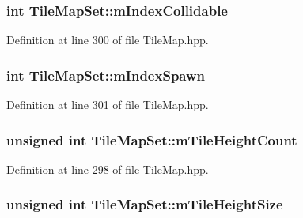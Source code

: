\hypertarget{class_tile_map_set_a02448f7bf82af58a2b660b7c4811479d}{
\subsubsection[{m\-Index\-Collidable}]{\setlength{\rightskip}{0pt plus 5cm}int Tile\-Map\-Set\-::m\-Index\-Collidable\hspace{0.3cm}{\ttfamily [protected]}}}\label{class_tile_map_set_a02448f7bf82af58a2b660b7c4811479d}


Definition at line 300 of file Tile\-Map.\-hpp.

\hypertarget{class_tile_map_set_abdcf3d4f5e9d82aeba620a7358068a42}{
\subsubsection[{m\-Index\-Spawn}]{\setlength{\rightskip}{0pt plus 5cm}int Tile\-Map\-Set\-::m\-Index\-Spawn\hspace{0.3cm}{\ttfamily [protected]}}}\label{class_tile_map_set_abdcf3d4f5e9d82aeba620a7358068a42}


Definition at line 301 of file Tile\-Map.\-hpp.

\hypertarget{class_tile_map_set_a6bd7b84fef3fdd9fb1312e256ec55b4a}{
\subsubsection[{m\-Tile\-Height\-Count}]{\setlength{\rightskip}{0pt plus 5cm}unsigned int Tile\-Map\-Set\-::m\-Tile\-Height\-Count\hspace{0.3cm}{\ttfamily [protected]}}}\label{class_tile_map_set_a6bd7b84fef3fdd9fb1312e256ec55b4a}


Definition at line 298 of file Tile\-Map.\-hpp.

\hypertarget{class_tile_map_set_aa4620605087a8738afdfa4ef3e5fad99}{
\subsubsection[{m\-Tile\-Height\-Size}]{\setlength{\rightskip}{0pt plus 5cm}unsigned int Tile\-Map\-Set\-::m\-Tile\-Height\-Size\hspace{0.3cm}{\ttfamily [protected]}}}\label{class_tile_map_set_aa4620605087a8738afdfa4ef3e5fad99}


